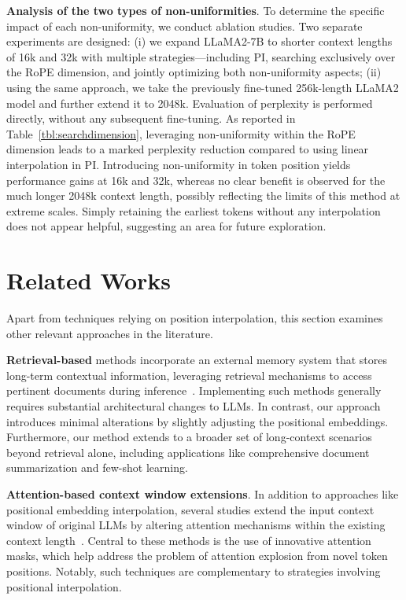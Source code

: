 \textbf{Analysis of the two types of non-uniformities}. To determine the specific impact of each non-uniformity, we conduct ablation studies. Two separate experiments are designed: (i) we expand LLaMA2-7B to shorter context lengths of 16k and 32k with multiple strategies—including PI, searching exclusively over the RoPE dimension, and jointly optimizing both non-uniformity aspects; (ii) using the same approach, we take the previously fine-tuned 256k-length LLaMA2 model and further extend it to 2048k. Evaluation of perplexity is performed directly, without any subsequent fine-tuning. As reported in Table~\ref{tbl:searchdimension}, leveraging non-uniformity within the RoPE dimension leads to a marked perplexity reduction compared to using linear interpolation in PI. Introducing non-uniformity in token position yields performance gains at 16k and 32k, whereas no clear benefit is observed for the much longer 2048k context length, possibly reflecting the limits of this method at extreme scales. Simply retaining the earliest tokens without any interpolation does not appear helpful, suggesting an area for future exploration.

\section{Related Works}

Apart from techniques relying on position interpolation, this section examines other relevant approaches in the literature.

\textbf{Retrieval-based} methods incorporate an external memory system that stores long-term contextual information, leveraging retrieval mechanisms to access pertinent documents during inference~\cite{longllama,wang2023augmenting,borgeaud2022improving}. Implementing such methods generally requires substantial architectural changes to LLMs. In contrast, our approach introduces minimal alterations by slightly adjusting the positional embeddings. Furthermore, our method extends to a broader set of long-context scenarios beyond retrieval alone, including applications like comprehensive document summarization and few-shot learning.

\textbf{Attention-based context window extensions}. In addition to approaches like positional embedding interpolation, several studies extend the input context window of original LLMs by altering attention mechanisms within the existing context length~\cite{han2023lminfinite, streamingllm,parallelwindow}. Central to these methods is the use of innovative attention masks, which help address the problem of attention explosion from novel token positions. Notably, such techniques are complementary to strategies involving positional interpolation.

